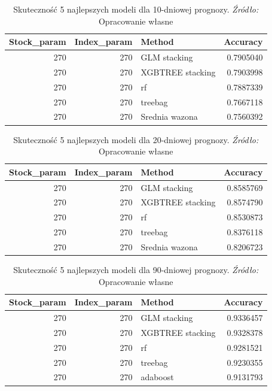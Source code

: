 \documentclass[12pt,a4paper,twoside,openany]{book}
\begin{document}
\begin{table}[ht]
\caption{Skuteczność 5 najlepszych modeli dla 10-dniowej prognozy. \textit{Źródło:} Opracowanie własne}
\label{tab013}
\centering
\begin{tabular}{rrlr}
  \hline
Stock\_param & Index\_param & Method & Accuracy \\ 
  \hline
     270 &      270 & GLM stacking & 0.7905040 \\ 
       270 &      270 & XGBTREE stacking & 0.7903998 \\ 
       270 &      270 & rf & 0.7887339 \\ 
       270 &      270 & treebag & 0.7667118 \\ 
       270 &      270 & Srednia wazona & 0.7560392 \\ 
   \hline
\end{tabular}
\end{table}


\begin{table}[ht]
\caption{Skuteczność 5 najlepszych modeli dla 20-dniowej prognozy. \textit{Źródło:} Opracowanie własne}
\label{tab014}
\centering
\begin{tabular}{rrlr}
  \hline
Stock\_param & Index\_param & Method & Accuracy \\ 
  \hline
     270 &      270 & GLM stacking & 0.8585769 \\ 
       270 &      270 & XGBTREE stacking & 0.8574790 \\ 
       270 &      270 & rf & 0.8530873 \\ 
       270 &      270 & treebag & 0.8376118 \\ 
       270 &      270 & Srednia wazona & 0.8206723 \\ 
   \hline
\end{tabular}
\end{table}


\begin{table}[ht]
\caption{Skuteczność 5 najlepszych modeli dla 90-dniowej prognozy. \textit{Źródło:} Opracowanie własne}
\label{tab015}
\centering
\begin{tabular}{rrlr}
  \hline
Stock\_param & Index\_param & Method & Accuracy \\ 
  \hline
     270 &      270 & GLM stacking & 0.9336457 \\ 
       270 &      270 & XGBTREE stacking & 0.9328378 \\ 
       270 &      270 & rf & 0.9281521 \\ 
       270 &      270 & treebag & 0.9230355 \\ 
       270 &      270 & adaboost & 0.9131793 \\ 
   \hline
\end{tabular}
\end{table}
\end{document}
